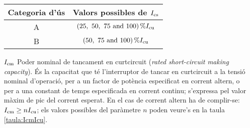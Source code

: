 \begin{list}{}
        \begin{center}
            \label{taula:IcsIcu}
           \begin{tabular}{cc}
           \toprule[1pt]
           Categoria d'ús &  Valors possibles de $I_\mathrm{cs}$ \\
           \midrule
           A & $\qtylist[list-units = brackets]{25;50;75;100}{\percent} I\ped{cu}$ \\
           B & $\qtylist[list-units = brackets]{50;75;100}{\percent} I\ped{cu}$  \\
           \bottomrule[1pt]
           \end{tabular}
         \end{center}
    \item[$I_\mathrm{cm}$] Poder nominal de tancament en curtcircuit (\textit{rated short-circuit making capacity}). És la capacitat que té l'interruptor de tancar en curtcircuit a la tensió nominal d'operació, per a un factor de potència especificat en corrent altern, o per a una constant de temps especificada en corrent continu; s'expressa pel valor màxim de pic del corrent esperat. En el cas de corrent altern ha de complir-se: $I_\mathrm{cm} \geq n I_\mathrm{cu}$; els valors possibles del paràmetre $n$ poden veure's en la taula \vref{taula:IcmIcu}.


\end{list}

